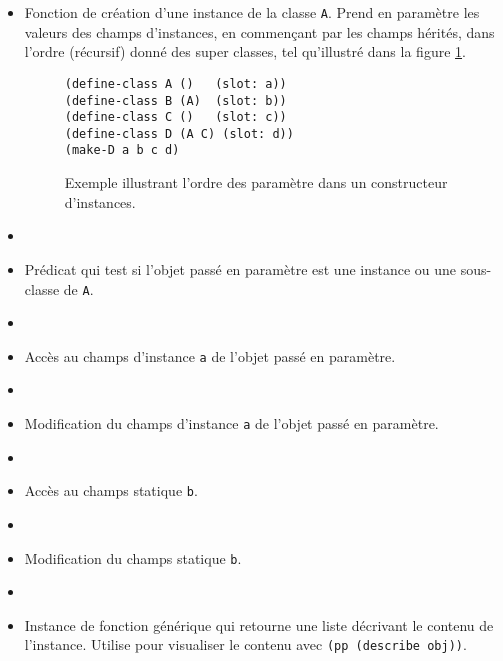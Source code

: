       \begin{itemize}
      \item[\texttt{(make-A a)}:] Fonction de création d'une instance
        de la classe \texttt{A}. Prend en paramètre les valeurs des
        champs d'instances, en commençant par les champs hérités, dans
        l'ordre (récursif) donné des super classes, tel qu'illustré
        dans la figure \ref{ex-make-instance}.
        \begin{figure}[h!]
          \begin{lstlisting}
(define-class A ()   (slot: a))
(define-class B (A)  (slot: b))
(define-class C ()   (slot: c))
(define-class D (A C) (slot: d))
(make-D a b c d)
          \end{lstlisting}
          \caption{Exemple illustrant l'ordre des paramètre dans un
            constructeur d'instances.}
          \label{ex-make-instance}
        \end{figure}
      \item[]

      \item[\texttt{(A? obj)}:] Prédicat qui test si l'objet passé en
        paramètre est une instance ou une sous-classe de \texttt{A}.
      \item[]

      \item[\texttt{(A-a obj)}:] Accès au champs d'instance \texttt{a}
        de l'objet passé en paramètre.
      \item[]

      \item[\texttt{(A-a-set! obj new-a)}:] Modification du champs
        d'instance \texttt{a} de l'objet passé en paramètre.
      \item[]

      \item[\texttt{(A-b)}:] Accès au champs statique \texttt{b}.
      \item[]

      \item[\texttt{(A-b-set! new-b)}:] Modification du champs
        statique \texttt{b}.
      \item[]

      \item[\texttt{(describe obj)}:] Instance de fonction générique
        qui retourne une liste décrivant le contenu de
        l'instance. Utilise pour visualiser le contenu avec
        \texttt{(pp (describe obj))}.
      \end{itemize}

